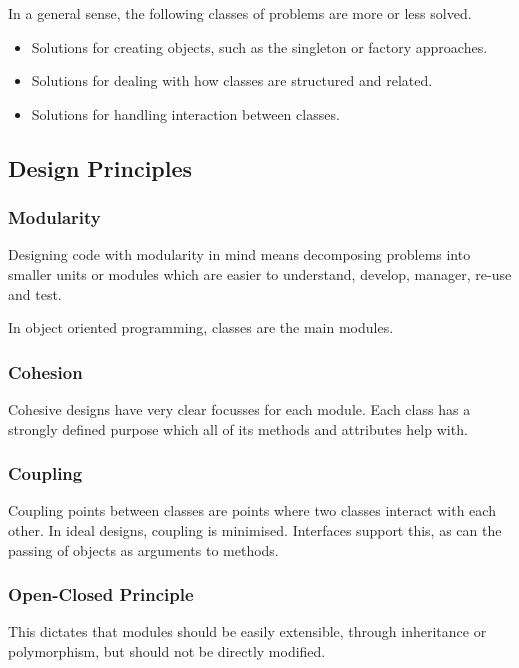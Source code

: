 \documentclass[12pt]{report}
\begin{document}
\begin{flushleft}
In a general sense, the following classes of problems are more or less solved.

\begin{itemize}
    \item Solutions for creating objects, such as the singleton or factory
        approaches.
    \item Solutions for dealing with how classes are structured and related.
    \item Solutions for handling interaction between classes.
\end{itemize}

\subsection*{Design Principles}

\subsubsection*{Modularity}

Designing code with modularity in mind means decomposing problems into smaller
units or modules which are easier to understand, develop, manager, re-use and
test. \par
In object oriented programming, classes are the main modules.

\subsubsection*{Cohesion}

Cohesive designs have very clear focusses for each module. Each class has a
strongly defined purpose which all of its methods and attributes help with.

\subsubsection*{Coupling}

Coupling points between classes are points where two classes interact with each
other. In ideal designs, coupling is minimised. Interfaces support this, as can
the passing of objects as arguments to methods.

\subsubsection*{Open-Closed Principle}

This dictates that modules should be easily extensible, through inheritance or
polymorphism, but should not be directly modified.


\end{flushleft}
\end{document}
